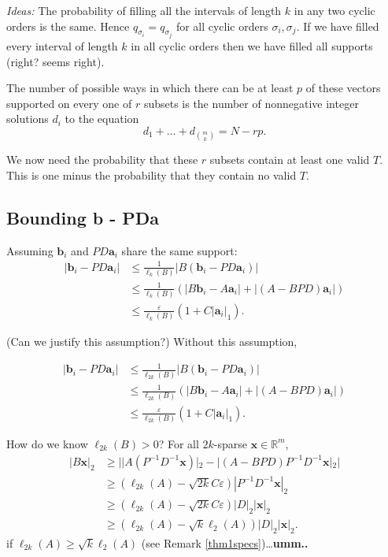 \documentclass[journal, onecolumn]{IEEEtran}
\begin{document}
\emph{Ideas:} The probability of filling all the intervals of length $k$ in any two cyclic orders is the same. Hence $q_{\sigma_i} = q_{\sigma_j}$ for all cyclic orders $\sigma_i, \sigma_j$. If we have filled every interval of length $k$ in all cyclic orders then we have filled all supports (right? seems right).

The number of possible ways in which there can be at least $p$ of these vectors supported on every one of $r$ subsets is the number of nonnegative integer solutions $d_i$ to the equation
\[ d_1 + \ldots + d_{{m \choose k} }= N - rp.\]

We now need the probability that these $r$ subsets contain at least one valid $T$.  This is one minus the probability that they contain no valid $T$. 

\subsection{Bounding b - PDa}

Assuming $\mathbf{b}_i$ and $PD\mathbf{a}_i$ share the same support:
\begin{align*}
|\mathbf{b}_i - PD\mathbf{a}_i| 
&\leq \frac{1}{\ell_{k}(B)}|B(\mathbf{b}_i - PD\mathbf{a}_i)| \\
&\leq \frac{1}{\ell_{k}(B)} (|B\mathbf{b}_i - A\mathbf{a}_i| + |(A - BPD)\mathbf{a}_i|) \\
&\leq \frac{\varepsilon}{\ell_{k}(B)}(1+C|\mathbf{a}_i|_1).
\end{align*}

(Can we justify this assumption?) Without this assumption,

\begin{align*}
|\mathbf{b}_i - PD\mathbf{a}_i| 
&\leq \frac{1}{\ell_{2k}(B)}|B(\mathbf{b}_i - PD\mathbf{a}_i)| \\
&\leq \frac{1}{\ell_{2k}(B)} (|B\mathbf{b}_i - A\mathbf{a}_i| + |(A - BPD)\mathbf{a}_i|) \\
&\leq \frac{\varepsilon}{\ell_{2k}(B)}(1+C|\mathbf{a}_i|_1).
\end{align*}

How do we know $\ell_{2k}(B) > 0$? For all $2k$-sparse $\mathbf{x} \in \mathbb{R}^m$,
\begin{align*}
|B\mathbf{x}|_2 
&\geq | |A(P^{-1}D^{-1}\mathbf{x})|_2 - |(A-BPD)P^{-1}D^{-1}\mathbf{x}|_2 | \\
&\geq (\ell_{2k}(A) - \sqrt{2k}C\varepsilon)|P^{-1}D^{-1}\mathbf{x}|_2 \\
&\geq (\ell_{2k}(A) - \sqrt{2k}C\varepsilon)|D|_2|\mathbf{x}|_2 \\
&\geq (\ell_{2k}(A) - \sqrt{k}\ell_2(A))|D|_2|\mathbf{x}|_2. 
\end{align*}
%
if $\ell_{2k}(A) \geq \sqrt{k}\ell_2(A)$ (see Remark \ref{thm1specs})\ldots\textbf{umm..} 
\end{document}
